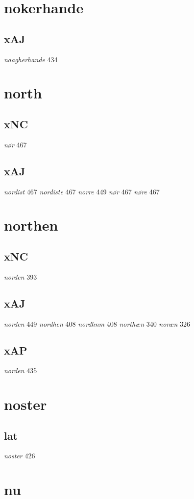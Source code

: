 \documentclass[a4paper,twocolumn]{article}
\begin{document}
\section{nokerhande}
\label{sec:org034f304}
\subsection{xAJ}
\label{sec:org440ae8c}
\emph{naagherhande} 434 
\section{north}
\label{sec:orge9a2193}
\subsection{xNC}
\label{sec:orgcc27e9b}
\emph{nør} 467 
\subsection{xAJ}
\label{sec:orgef17f70}
\emph{nordist} 467 \emph{nordiste} 467 \emph{norre} 449 \emph{nør} 467 \emph{nøre} 467 
\section{northen}
\label{sec:orgdb78311}
\subsection{xNC}
\label{sec:org28898ae}
\emph{norden} 393 
\subsection{xAJ}
\label{sec:org183f7d6}
\emph{norden} 449 \emph{nordhen} 408 \emph{nordhnm} 408 \emph{northæn} 340 \emph{noræn} 326 
\subsection{xAP}
\label{sec:org2a3594b}
\emph{norden} 435 
\section{noster}
\label{sec:org4e717f5}
\subsection{lat}
\label{sec:orge54e85a}
\emph{noster} 426 
\section{nu}
\label{sec:orgdf86b22}
\end{document}
